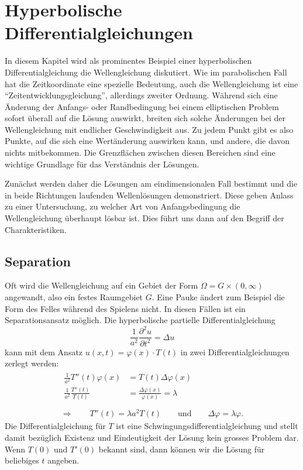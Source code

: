 %
%
%
\chapter{Hyperbolische Differentialgleichungen\label{chapter-hyperbolisch}}
\rhead{}
In diesem Kapitel wird als prominentes Beispiel einer hyperbolischen
Differentialgleichung die Wellengleichung diskutiert.
Wie im parabolischen Fall hat die Zeitkoordinate eine spezielle Bedeutung,
auch die Wellengleichung ist eine ``Zeitentwicklungsgleichung'', allerdings
zweiter Ordnung. Während sich eine Änderung der Anfangs- oder Randbedingung
bei einem elliptischen Problem sofort überall auf die Lösung auswirkt,
breiten sich solche Änderungen bei der Wellengleichung mit endlicher
Geschwindigkeit aus. Zu jedem Punkt gibt es also Punkte, auf die sich eine
Wertänderung auswirken kann, und andere, die davon nichts mitbekommen.
Die Grenzflächen zwischen diesen Bereichen sind eine wichtige Grundlage
für das Verständnis der Lösungen.

Zunächst werden daher die Lösungen 
am eindimensionalen Fall bestimmt und die in beide Richtungen laufenden 
Wellenlösungen demonstriert. Diese geben Anlass zu einer Untersuchung,
zu welcher Art von Anfangsbedingung die Wellengleichung überhaupt
lösbar ist. Dies führt uns dann auf den Begriff der Charakteristiken.

\section{Separation}
Oft wird die Wellengleichung auf ein Gebiet der Form
$\Omega = G\times(0,\infty)$ angewandt, also ein 
festes Raumgebiet $G$.
Eine Pauke ändert zum Beispiel die Form des Felles während des
Spielens nicht. In diesen Fällen ist ein Separationsansatz möglich.
Die hyperbolische partielle Differentialgleichung 
\[
\frac1{a^2}\frac{\partial^2 u}{\partial t^2}=\Delta u
\]
kann mit dem Ansatz $u(x,t)=\varphi(x)\cdot T(t)$ in zwei
Differentialgleichungen zerlegt werden:
\begin{gather*}
\begin{aligned}
\frac1{a^2}T''(t)\varphi(x)&=T(t)\Delta \varphi(x)\\
\frac1{a^2}\frac{T''(t)}{T(t)}&=\frac{\Delta\varphi(x)}{\varphi(x)}=\lambda\\
\end{aligned}
\\
\Rightarrow\qquad
T''(t)=\lambda a^2T(t)\qquad\text{und}\qquad\Delta \varphi=\lambda\varphi.
\end{gather*}
Die Differentialgleichung für $T$ ist eine Schwingungsdifferentialgleichung
und stellt damit bezüglich Existenz und Eindeutigkeit der Lösung
kein grosses Problem dar. Wenn $T(0)$ und $T'(0)$ bekannt sind, dann
können wir die Lösung für beliebiges $t$ angeben.

